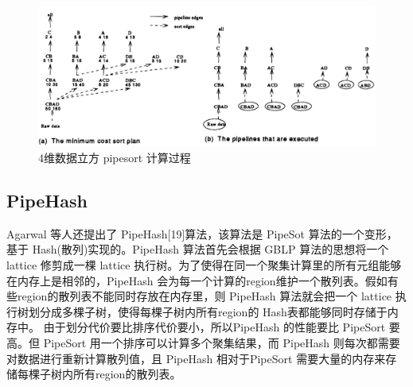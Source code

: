\begin{figure}[!htb]
\centering\includegraphics[width=5.5in]{picture/ch_current_research/pipesort} 
\caption{4维数据立方 pipesort 计算过程}\label{pipesort} 
\end{figure} 

\subsection{PipeHash}

Agarwal 等人还提出了 PipeHash[19]算法，该算法是 PipeSot 算法的一个变形，基于 Hash(散列)实现的。PipeHash 算法首先会根据 GBLP 算法的思想将一个 lattice 修剪成一棵 lattice 执行树。为了使得在同一个聚集计算里的所有元组能够在内存上是相邻的，PipeHash 会为每一个计算的region维护一个散列表。假如有些region的散列表不能同时存放在内存里，则 PipeHash 算法就会把一个 lattice 执行树划分成多棵子树，使得每棵子树内所有region的 Hash表都能够同时存储于内存中。 由于划分代价要比排序代价要小，所以PipeHash 的性能要比 PipeSort 要高。但 PipeSort 用一个排序可以计算多个聚集结果，而 PipeHash 则每次都需要对数据进行重新计算散列值，且 PipeHash 相对于PipeSort 需要大量的内存来存储每棵子树内所有region的散列表。



